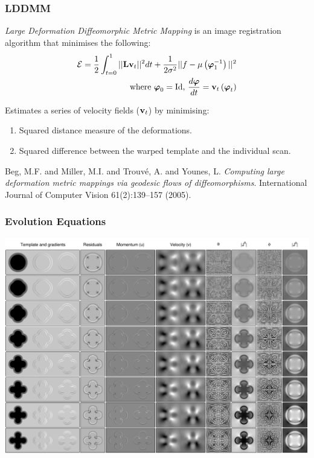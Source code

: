 \documentclass{beamer}
\begin{document}


\begin{frame}
\frametitle{LDDMM}
\emph{Large Deformation Diffeomorphic Metric Mapping} is an image registration algorithm that minimises the following:
\begin{eqnarray*}
\mathcal{E}  =   \frac{1}{2} \int_{t=0}^1  || {\bf L} {\bf v}_t ||^2 dt +
                 \frac{1}{2\sigma^2} || f - \mu\left({\boldsymbol\varphi}_1^{-1}\right)||^2\\
\text{  where } {\boldsymbol\varphi}_0 = \mathrm{Id} \text{, } \frac{d{\boldsymbol\varphi}}{dt} = {\bf v}_t\left({\boldsymbol\varphi}_t\right)
\end{eqnarray*}

Estimates a series of velocity fields (${\bf v}_t$) by minimising:
\begin{enumerate}
\item{Squared distance measure of the deformations.}
\item{Squared difference between the warped template and the individual scan.}
\end{enumerate}

\tiny{Beg, M.F. and Miller, M.I. and Trouv{\'e}, A. and Younes, L.
\emph{Computing large deformation metric mappings via geodesic flows of diffeomorphisms}.
International Journal of Computer Vision 61(2):139--157 (2005).}

\end{frame}

\begin{frame}
\frametitle{Evolution Equations}
\begin{center}
\includegraphics[width=.9\textwidth]{evolution}
\end{center}
\end{frame}
\end{document}
